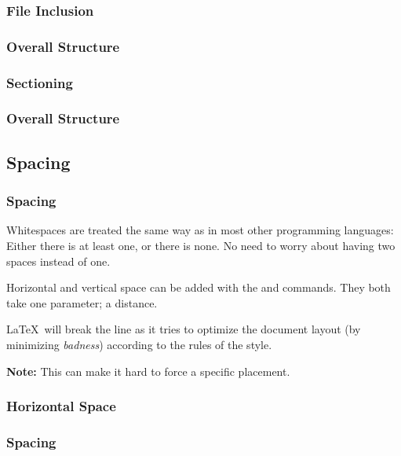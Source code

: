 {\subsubsection{File Inclusion}
\begin{frame}[fragile]
  \frametitle{Overall Structure }
  \vspace{3mm}
  
\end{frame}

\subsubsection{Sectioning}
\begin{frame}[fragile]
  \frametitle{Overall Structure }
  \vspace{3mm}
  
\end{frame}

\subsection{Spacing}
\begin{frame}[fragile]
  \frametitle{Spacing}
  \vspace{3mm}
  Whitespaces are treated the same way as in most other programming languages: Either there is at least one, or there is none. No need to worry about having two spaces instead of one.
  
  \vspace{5mm}
  Horizontal and vertical space can be added with the  and  commands. They both take one parameter; a distance.
  
  \vspace{5mm}
  \LaTeX\ will break the line as it tries to optimize the document layout (by minimizing \textsl{badness}) according to the rules of the style.
  
  \vspace{5mm}
  \textbf{Note:} This can make it hard to force a specific placement.
\end{frame}

\subsubsection{Horizontal Space}
\begin{frame}[fragile]
  \frametitle{Spacing }
  \vspace{3mm}
\end{frame}}
